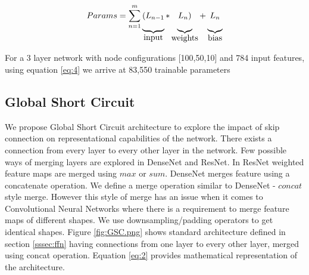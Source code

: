\documentclass{article}
\begin{document}
\begin{equation}
\label{eq:4}
Params= \sum_{n=1}^{m}
\underbrace{(L_{n-1}\rule[-12pt]{0pt}{5pt}}_{\mbox{input}}
*\underbrace{L_{n})\rule[-12pt]{0pt}{5pt}}_{\mbox{weights}}
+\underbrace{L_{n}\rule[-12pt]{0pt}{5pt}}_{\mbox{bias}}
\end{equation}

For a 3 layer network with node configurations [100,50,10] and 784 input features, using equation \ref{eq:4} we arrive at 83,550 trainable parameters


\vspace{2em}

\subsection{Global Short Circuit}
We propose Global Short Circuit architecture to explore the impact of skip connection on representational capabilities of the network. There exists a connection from every layer to every other layer in the network. Few possible ways of merging layers are explored in DenseNet\cite{Li2018DenselyCC} and ResNet\cite{He2016DeepRL}. In ResNet weighted feature maps are merged using $max$ or $sum$. DenseNet merges feature using a concatenate operation. We define a merge operation similar to DenseNet - $concat$ style merge. However this style of merge has an issue when it comes to Convolutional Neural Networks where there is a requirement to merge feature maps of different shapes. We use downsampling/padding operators to get identical shapes. Figure \ref{fig:GSC.png} shows standard architecture defined in section \ref{sssec:ffn} having connections from one layer to every other layer, merged using concat operation. Equation \ref{eq:2} provides mathematical representation of the architecture.
\end{document}

